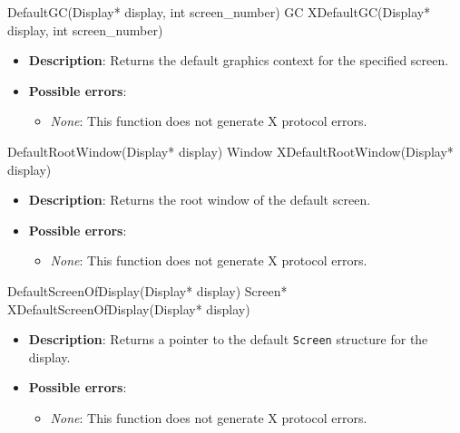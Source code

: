 \documentclass{report}
\begin{document}
\begin{itemize}
        \begin{cppcode}
            DefaultGC(Display* display, int screen_number)
            GC XDefaultGC(Display* display, int screen_number)
        \end{cppcode}
        \begin{itemize}
            \item \textbf{Description}: Returns the default graphics context for the specified screen.
            \item \textbf{Possible errors}:
                \begin{itemize}
                    \item \textit{None}: This function does not generate X protocol errors.
                \end{itemize}
        \end{itemize}

        \begin{cppcode}
            DefaultRootWindow(Display* display)
            Window XDefaultRootWindow(Display* display)
        \end{cppcode}
        \begin{itemize}
            \item \textbf{Description}: Returns the root window of the default screen.
            \item \textbf{Possible errors}:
                \begin{itemize}
                    \item \textit{None}: This function does not generate X protocol errors.
                \end{itemize}
        \end{itemize}

        \begin{cppcode}
            DefaultScreenOfDisplay(Display* display)
            Screen* XDefaultScreenOfDisplay(Display* display)
        \end{cppcode}
        \begin{itemize}
            \item \textbf{Description}: Returns a pointer to the default \texttt{Screen} structure for the display.
            \item \textbf{Possible errors}:
                \begin{itemize}
                    \item \textit{None}: This function does not generate X protocol errors.
                \end{itemize}
        \end{itemize}


\end{itemize}
\end{document}
